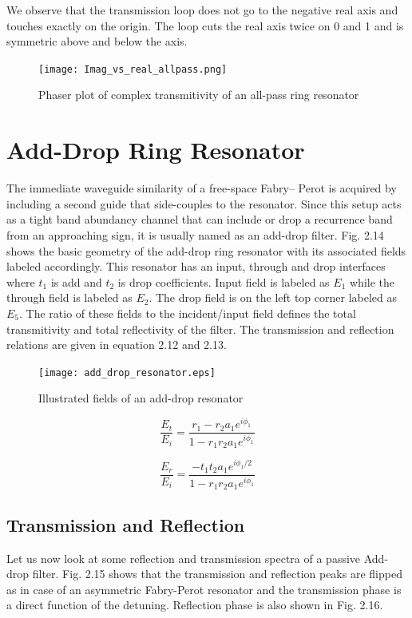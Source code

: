 We observe that the transmission loop does not go to the negative real axis and touches exactly on the origin. The loop cuts the real axis twice on 0 and 1 and is symmetric above and below the axis. 
\begin{figure}[h]
\centering
\texttt{[image: Imag\_vs\_real\_allpass.png]}
\caption{Phaser plot of complex transmitivity of an all-pass ring resonator}
\end{figure}


\section{Add-Drop Ring Resonator}
The immediate waveguide similarity of a free-space Fabry– Perot is acquired by including a second guide that side-couples to the resonator.
Since this setup acts as a tight band abundancy channel that can include or drop a recurrence band from an approaching sign, it is usually named as an add-drop filter. Fig. 2.14 shows the basic geometry of the add-drop ring resonator with its associated fields labeled accordingly. This resonator has an input, through and drop interfaces where $t_{1}$ is add and $t_{2}$ is drop coefficients. Input field is labeled as $E_{1}$ while the through field is labeled as $E_{2}$. The drop field is on the left top corner labeled as $E_{5}$. The ratio of these fields to the incident/input field defines the total transmitivity and total reflectivity of the filter. The transmission and reflection relations are given in equation 2.12 and 2.13.
\begin{figure}[h]
\centering
\texttt{[image: add\_drop\_resonator.eps]}
\caption{Illustrated fields of an add-drop resonator}
\end{figure}


\begin{equation}
\frac{E_{t}}{E_{i}} = \frac{r_{1} - r_{2} a_{1} e^{i\phi_{1}}}{1 - r_{1} r_{2} a_{1} e^{i\phi_{1}}}
\end{equation}

\begin{equation}
\frac{E_{r}}{E_{i}} = \frac{- t_{1} t_{2} a_{1} e^{i \phi_{1}/2}}{1 - r_{1} r_{2} a_{1} e^{i\phi_{1}}}
\end{equation}



\subsection{Transmission and Reflection}
Let us now look at some reflection and transmission spectra of a passive Add- drop filter. Fig. 2.15 shows that the transmission and reflection peaks are flipped as in case of an asymmetric Fabry-Perot resonator and the transmission phase is a direct function of the detuning. Reflection phase is also shown in Fig. 2.16.

